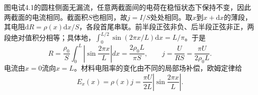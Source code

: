 \documentclass[UTF8,fontset=fandol,a4paper,11pt]{ctexart}
\begin{document}
图电试4.1的圆柱侧面无漏流，任意两截面间的电荷在稳恒状态下保持不变，因此两截面的电流相同。截面积$S$也相同，故$j=I/S$处处相同。取$x$到$x+\mathrm dx$的薄段，其电阻$\mathrm dR=\rho(x)\mathrm dx/S$，各段首尾串联。前半段正弦非负、后半段正弦非正，两段绝对值积分相等；具体地，$\int_0^{L/2}\sin(2\pi x/L)\mathrm dx=L/\pi$。于是
\[
R=\frac{\rho_0}{S}\int_0^L\left|\sin\frac{2\pi x}{L}\right|dx
=\boxed{\frac{2\rho_0L}{\pi S}},\qquad
\boxed{j=\frac{U}{RS}=\frac{\pi U}{2\rho_0L}}.
\]
电流由$x=0$流向$x=L$。材料电阻率的变化由不同的局部场补偿，欧姆定律给
\[
\boxed{E_x(x)=\rho(x)j=\frac{\pi U}{2L}
\left|\sin\frac{2\pi x}{L}\right|}.
\]
\begin{center}\begin{minipage}{.98\linewidth}\centering
{}
\end{minipage}
\end{center}
\end{document}
